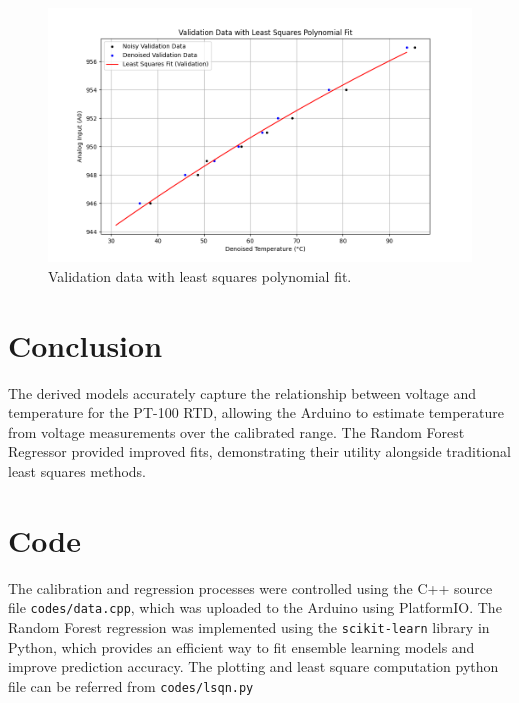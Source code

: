 \documentclass[journal,onecolumn]{IEEEtran}
\begin{document}
	\begin{figure}[h]
		\centering
		\includegraphics[width=1\textwidth]{figs/valid_fit.png}
		\caption{Validation data with least squares polynomial fit.}
		\label{fig:valid_fit}
	\end{figure}
	\section{Conclusion}
	The derived models accurately capture the relationship between voltage and temperature for the PT-100 RTD, allowing the Arduino to estimate temperature from voltage measurements over the calibrated range. The Random Forest Regressor provided improved fits, demonstrating their utility alongside traditional least squares methods.
	
	\section{Code}
	The calibration and regression processes were controlled using the C++ source file \texttt{codes/data.cpp}, which was uploaded to the Arduino using PlatformIO. The Random Forest regression was implemented using the \texttt{scikit-learn} library in Python, which provides an efficient way to fit ensemble learning models and improve prediction accuracy. The plotting and least square computation python file can be referred from \texttt{codes/lsqn.py}
	
	
\end{document}
